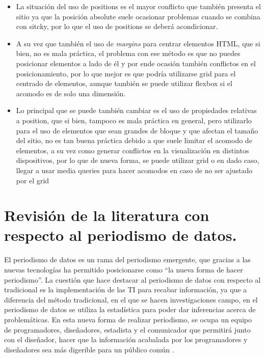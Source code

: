 \documentclass[11pt,DIV=9, letterpaper, oneside, openright]{scrartcl}
\begin{document}
\begin{itemize}
    \item  La situación del uso de positions es el mayor conflicto que también presenta el sitio ya que la posición absolute suele ocasionar problemas cuando se combina con sitcky, por lo que el uso de positions se deberá acondicionar. 
    
    \item A su vez que también el uso de \emph{margins} para centrar elementos HTML, que si bien, no es mala práctica, el problema con ese método es que no puedes posicionar elementos a lado de él y por ende ocasión también conflictos en el posicionamiento, por lo que mejor es que podría utilizarse grid para el centrado de elementos, aunque también se puede utilizar flexbox si el acomodo es de solo una dimensión.
    
    \item Lo principal que se puede también cambiar es el uso de propiedades relativas a position, que si bien, tampoco es mala práctica en general, pero utilizarlo para el uso de elementos que sean grandes de bloque y que afectan el tamaño del sitio, no es tan buena práctica debido a que suele limitar el acomodo de elementos, a su vez como generar conflictos en la visualización en distintos dispositivos, por lo que de nueva forma, se puede utilizar grid o en dado caso, llegar a usar media queries para hacer acomodos en caso de no ser ajustado por el grid   
\end{itemize}

\section{Revisión de la literatura con respecto al periodismo de datos.}

El periodismo de datos es un rama del periodismo emergente, que gracias a las nuevas tecnologías ha permitido posicionarse como ``la nueva forma de hacer periodismo''. La cuestión que hace destacar al periodismo de datos con respecto al tradicional es la implementación de las TI para recabar información, ya que a diferencia del método tradicional, en el que se hacen investigaciones campo, en el periodismo de datos se utiliza la estadística para poder dar inferencias acerca de problemáticas. En esta nueva forma de realizar periodismo, se ocupa un equipo de programadores, diseñadores, estadista y el comunicador que permitirá junto con el diseñador, hacer que la información acabalada por los programadores y diseñadores sea más digerible para un público común \cite{mutsvairo2020data}.
\end{document}
